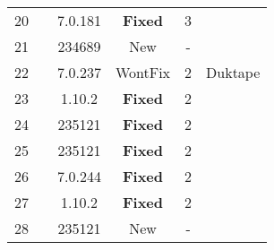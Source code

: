 \begin{table}[t!]
\begin{tabular}{rccccc}
       20 & \veight{} & 7.0.181 & \textbf{Fixed} & 3 & \jerry{}\\
       21 & \jsc{} & 234689 & New & - & \jerry{}\\
       22 & \veight{} & 7.0.237 & WontFix & 2 & Duktape\\
       23 & \chakra{} & 1.10.2 & \textbf{Fixed} & 2 & \smonkey{}\\
       24 & \jsc{} & 235121 & \textbf{Fixed} & 2 & \smonkey{}\\
       25 & \jsc{} & 235121 & \textbf{Fixed} & 2 & \smonkey{}\\
       26 & \veight{} & 7.0.244 & \textbf{Fixed} &  2  & \smonkey{}\\
       27 & \chakra{} & 1.10.2 & \textbf{Fixed} &  2  & \smonkey{}\\
       28 & \jsc{} & 235121 & New & - & \smonkey{}\\
       \bottomrule
      \end{tabular}
      \vspace{-2ex}
\end{table}
